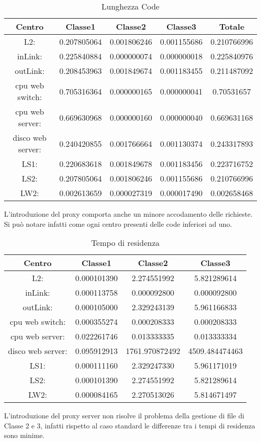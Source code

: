 \begin{table}[H]
\begin{center}
\begin{tabular}{||c|c|c|c|c||}
\hline
Centro &Classe1 &Classe2 &Classe3 &Totale\\
\hline
\hline
L2: &0.207805064 &0.001806246 &0.001155686 &0.210766996\\
\hline
inLink: &0.225840884 &0.000000074 &0.000000018 &0.225840976\\
\hline
outLink: &0.208453963 &0.001849674 &0.001183455 &0.211487092\\
\hline
cpu web switch: &0.705316364 &0.000000165 &0.000000041 &0.70531657\\
\hline
cpu web server: &0.669630968 &0.000000160 &0.000000040 &0.669631168\\
\hline
disco web server: &0.240420855 &0.001766664 &0.001130374 &0.243317893\\
\hline
LS1: &0.220683618 &0.001849678 &0.001183456 &0.223716752\\
\hline
LS2: &0.207805064 &0.001806246 &0.001155686 &0.210766996\\
\hline
LW2: &0.002613659 &0.000027319 &0.000017490 &0.002658468\\
\hline
\end{tabular}
\end{center}
\caption{Lunghezza Code}
\label{lunghezzacode}
\end{table}
L'introduzione del proxy comporta anche un minore accodamento delle richieste. Si può notare infatti come ogni centro presenti delle code inferiori ad uno.
\begin{table}[H]
\begin{center}
\begin{tabular}{||c|c|c|c||}
\hline
Centro &Classe1 &Classe2 &Classe3\\
\hline
\hline
L2: &0.000101390 &2.274551992 &5.821289614\\
\hline
inLink: &0.000113758 &0.000092800 &0.000092800\\
\hline
outLink: &0.000105000 &2.329243139 &5.961166833\\
\hline
cpu web switch: &0.000355274 &0.000208333 &0.000208333\\
\hline
cpu web server: &0.022261746 &0.013333335 &0.013333334\\
\hline
disco web server: &0.095912913 &1761.970872492 &4509.484474463\\
\hline
LS1: &0.000111160 &2.329247330 &5.961171019\\
\hline
LS2: &0.000101390 &2.274551992 &5.821289614\\
\hline
LW2: &0.000084165 &2.270513026 &5.814671497\\
\hline
\end{tabular}
\end{center}
\caption{Tempo di residenza}
\label{tempodiresidenza}
\end{table}
L'introduzione del proxy server non risolve il problema della gestione di file di Classe 2 e 3, infatti rispetto al caso standard le differenze tra i tempi di residenza sono minime.

